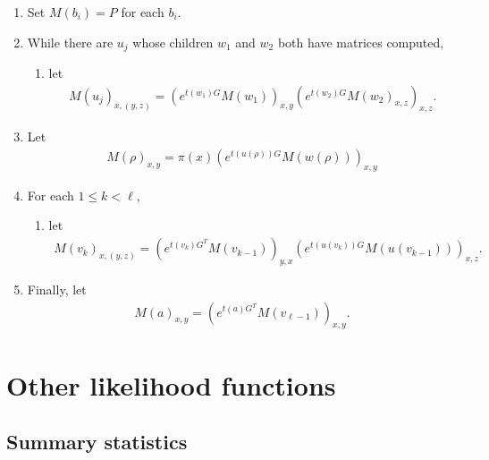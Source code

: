 \documentclass{article}
\theoremstyle{plain}
\theoremstyle{definition}
\begin{document}
\begin{enumerate}

  \item Set $M(b_i) = P$ for each $b_i$.

  \item While there are $u_j$ whose children $w_1$ and $w_2$ both have matrices computed,
    \begin{enumerate}
      \item let
        \begin{align}
          M(u_j)_{x,(y,z)} = \left( e^{t(w_1) G} M(w_1) \right)_{x,y} \left( e^{t(w_2) G} M(w_2)_{x,z} \right)_{x,z} .
        \end{align}
    \end{enumerate}

  \item Let
    \begin{align}
      M(\rho)_{x,y} = \pi(x) \left( e^{t(u(\rho)) G} M(w(\rho)) \right)_{x,y}
    \end{align}

  \item For each $1 \le k < \ell$,
    \begin{enumerate}
      \item let
        \begin{align}
          M(v_k)_{x,(y,z)} = \left( e^{t(v_k) G^T} M(v_{k-1}) \right)_{y,x} \left( e^{t(u(v_k)) G} M(u(v_{k-1})) \right)_{x,z}  .
        \end{align}
    \end{enumerate}

  \item Finally, let
    \begin{align}
      M(a)_{x,y} = \left( e^{t(a) G^T} M(v_{\ell-1}) \right)_{x,y}  .
    \end{align}

\end{enumerate}


\section{Other likelihood functions}

\subsection{Summary statistics}
\end{document}
